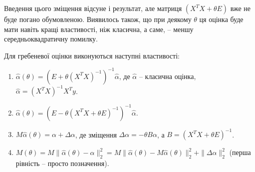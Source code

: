 Введення цього зміщення відсуне і результат, але матриця $(X^TX+\theta E)$ вже не буде погано обумовленою. Виявилось також, що при деякому $\theta$ ця оцінка буде мати навіть кращі властивості, ніж класична, а саме, -- меншу середньоквадратичну помилку.
\begin{theorem}
	Для гребеневої оцінки виконуються наступні властивості:
	\begin{enumerate}
		\item $\widehat{\alpha}(\theta) = (E+\theta(X^TX)^{-1})^{-1}\widehat{\alpha}$, де $\widehat{\alpha}$ -- класична оцінка, $\widehat{\alpha}=(X^TX)^{-1}X^Ty$.
		
		\item $\widehat{\alpha}(\theta) = (E-\theta(X^TX+\theta E)^{-1})^{-1}\widehat{\alpha}$.
		
		\item $M\widehat{\alpha}(\theta)=\alpha+\Delta\alpha$, де зміщення $\Delta\alpha=-\theta B\alpha$, а $B=(X^TX+\theta E)^{-1}$.
		\item $M(\theta) = M\|\widehat{\alpha}(\theta)-\alpha\|_2^2 = M \|\widehat{\alpha}(\theta)-M\widehat{\alpha}(\theta)\|_2^2 + \|\Delta\alpha\|_2^2$ (перша рівність -- просто позначення).
	\end{enumerate}
\end{theorem}
